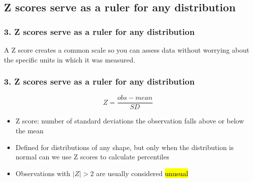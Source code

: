 \documentclass[11pt,containsverbatim,handout,xcolor=xelatex,dvipsnames,table]{beamer}
\begin{document}

\subsection{Z scores serve as a ruler for any distribution}
\label{mi3}


\begin{frame}
\frametitle{3. Z scores serve as a ruler for any distribution}

A Z score creates a common scale so you can assess data without worrying about the specific 
units in which it was measured.

\pause


\pause


\end{frame}


\begin{frame}
\frametitle{3. Z scores serve as a ruler for any distribution}

\[ Z = \frac{obs - mean}{SD} \]

\begin{itemize}

\item Z score: number of standard deviations the observation falls above or below the mean

\pause

\item Defined for distributions of any shape, but only when the distribution is normal can we use 
Z scores to calculate percentiles

\pause

\item Observations with $|Z| > 2$ are usually considered \hl{unusual}

\end{itemize}

\end{frame}

\end{document}
